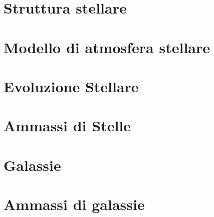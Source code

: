 \documentclass[11pt]{book} %
\begin{document}
\chapter{Struttura stellare}









\chapter{Modello di atmosfera stellare}





\chapter{Evoluzione Stellare}






\chapter{Ammassi di Stelle}


\chapter{Galassie}









\chapter{Ammassi di galassie}



\end{document}
